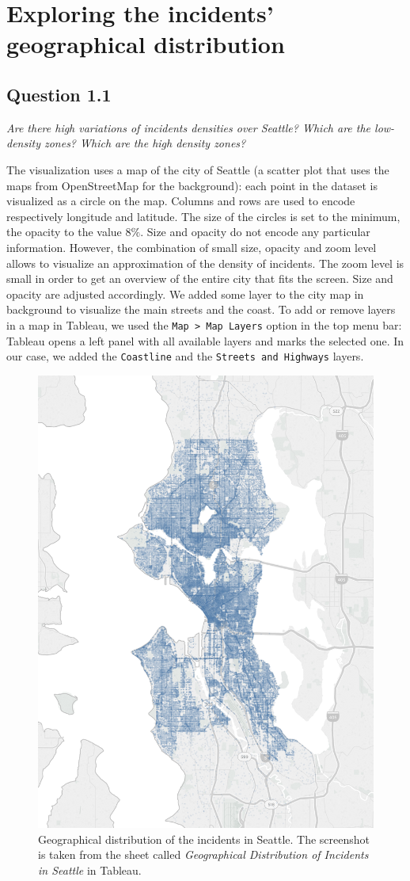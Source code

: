 \section{Exploring the incidents' geographical distribution}
\label{sec:question1}

\subsection*{Question 1.1}
\textit{Are there high variations of incidents densities over Seattle? Which are the low-density zones? Which are the high density zones?}

The visualization uses a map of the city of Seattle (a scatter plot that uses the maps from OpenStreetMap for the background):
each point in the dataset is visualized as a circle on the map.
Columns and rows are used to encode respectively longitude and latitude.
The size of the circles is set to the minimum, the opacity to the value $8\%$.
Size and opacity do not encode any particular information.
However, the combination of small size, opacity and zoom level allows to visualize an approximation of the density of incidents.
The zoom level is small in order to get an overview of the entire city that fits the screen.
Size and opacity are adjusted accordingly.
We added some layer to the city map in background to visualize the main streets and the coast.
To add or remove layers in a map in Tableau, we used the \texttt{Map > Map Layers} option in the top menu bar:
Tableau opens a left panel with all available layers and marks the selected one.
In our case, we added the \texttt{Coastline} and the \texttt{Streets and Highways} layers.

\begin{figure}[H]
	\centering
	\includegraphics[width=.65\columnwidth]{figures/1_1_geographical_distribution_incidents}
	\caption{Geographical distribution of the incidents in Seattle. The screenshot is taken from the sheet called \textit{Geographical Distribution of Incidents in Seattle} in Tableau.}
	\label{fig:1_1_geographical_distribution_incidents}
\end{figure}


